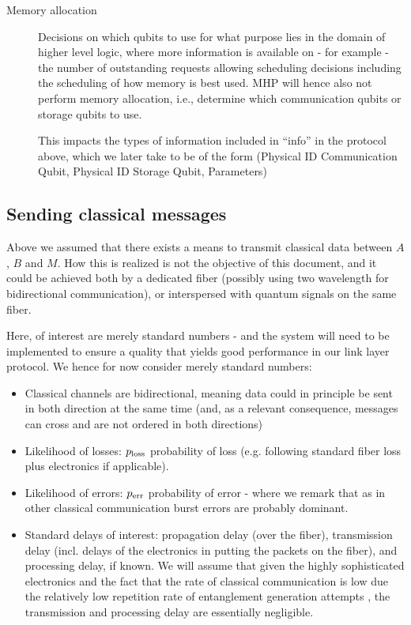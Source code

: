 \documentclass{article}
\begin{document}
\begin{description}
\item[Memory allocation]
Decisions on which qubits to use for what purpose lies in the domain of higher level logic, where more information is available 
on - for example - the number of outstanding requests allowing scheduling decisions including the scheduling of how memory is best used.
MHP will hence also not perform memory allocation, i.e., determine which communication qubits or storage qubits to use. 

This impacts the types of information included in ``info'' in the protocol above, which we later take to be of the form (Physical ID Communication Qubit, Physical ID Storage Qubit, Parameters)
\end{description}

\subsection{Sending classical messages}\label{sec:classicalMessages}

Above we assumed that there exists a means to transmit classical data between $A$, $B$ and $M$. How this is realized is not the objective of this document, and it could be achieved both by a dedicated fiber (possibly using two wavelength for bidirectional communication), or interspersed with quantum signals on the same fiber. 

Here, of interest are merely standard numbers - and the system will need to be implemented to ensure a quality that yields good performance in our link layer protocol.
We hence for now consider merely standard numbers: 

\begin{itemize}
\item Classical channels are bidirectional, meaning data could in principle be sent in both direction at the same time (and, as a relevant consequence, messages can cross and are not ordered in both directions)
\item Likelihood of losses: $p_{\rm loss}$ probability of loss (e.g. following standard fiber loss plus electronics if applicable).
\item Likelihood of errors:  $p_{\rm err}$ probability of error - where we remark that as in other classical communication burst errors are probably dominant. 
\item Standard delays of interest: propagation delay (over the fiber), transmission delay (incl. delays of the electronics in putting the packets on the fiber), and processing delay, if known. We will assume that given the highly sophisticated electronics and the fact that the rate of classical communication is low due the relatively low repetition rate of entanglement generation attempts , the transmission and processing delay are essentially negligible.
\end{itemize}
\end{document}
